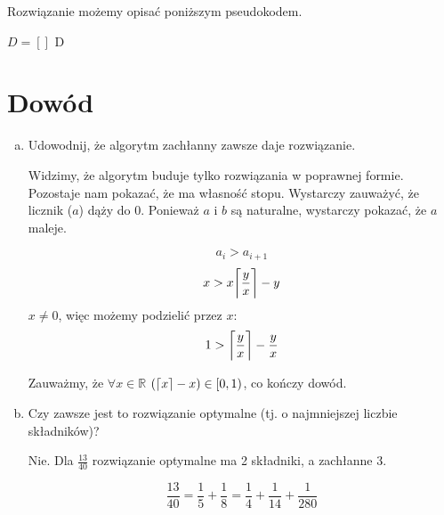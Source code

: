 \documentclass[a4paper]{article}
\DeclarePairedDelimiter\ceil{\lceil}{\rceil}
\newcommand\doubleplus{+\kern-1.3ex+\kern0.8ex}
\begin{document}
Rozwiązanie możemy opisać poniższym pseudokodem.


\begin{algorithm}[H]
 $D = []$\;
 \While{$a > 0$}{
 	$d = \ceil{\frac{b}{a}}$\;
    $D = [d] \doubleplus D$\;
    $a = a*d - b$\;
    $b = b*d$\;
 }
 \Return D
\end{algorithm}

\section{Dowód}

\begin{enumerate}[a)]
\item Udowodnij, że algorytm zachłanny zawsze daje rozwiązanie.

Widzimy, że algorytm buduje tylko rozwiązania w poprawnej formie. Pozostaje nam pokazać, że ma własność stopu.
Wystarczy zauważyć, że licznik ($a$) dąży do 0.
Ponieważ $a$ i $b$ są naturalne, wystarczy pokazać, że $a$ maleje.

$$
	a_{i} > a_{i + 1}
$$
$$
	x > x\ceil[\bigg]{\frac{y}{x}} - y
$$
$ x \neq 0 $, więc możemy podzielić przez $x$:
$$
	1 > \ceil[\bigg]{\frac{y}{x}} - \frac{y}{x}
$$

Zauważmy, że $\forall x \in \mathbb{R}$ $\left(\ceil{x} - x\right) \in [0, 1)$, co kończy dowód.

\item Czy zawsze jest to rozwiązanie optymalne (tj. o najmniejszej liczbie składników)?

Nie. Dla $\frac{13}{40}$ rozwiązanie optymalne ma 2 składniki, a zachłanne 3.

$$
	\frac{13}{40} =
    \frac{1}{5} +
    \frac{1}{8} =
    \frac{1}{4} +
    \frac{1}{14} +
    \frac{1}{280}
$$


\end{enumerate}
\end{document}

